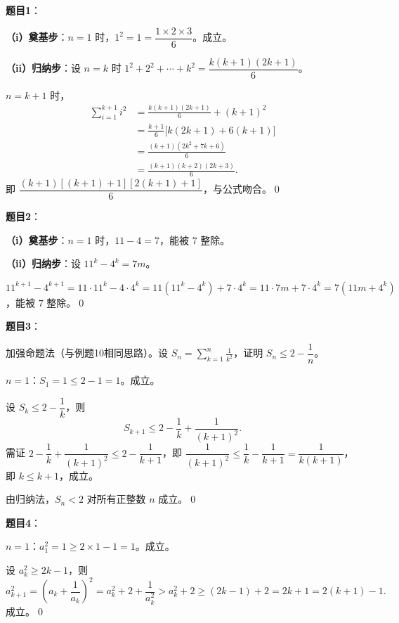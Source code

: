 \documentclass[12pt, a4paper]{ctexart}
\begin{document}
\begin{knowledgebox}[参考答案]

\textbf{题目1}：

\textbf{（i）奠基步}：$n=1$ 时，$1^2 = 1 = \dfrac{1 \times 2 \times 3}{6}$。成立。

\textbf{（ii）归纳步}：设 $n = k$ 时 $1^2 + 2^2 + \cdots + k^2 = \dfrac{k(k+1)(2k+1)}{6}$。

$n = k+1$ 时，
\begin{align*}
\sum_{i=1}^{k+1} i^2 &= \frac{k(k+1)(2k+1)}{6} + (k+1)^2 \\
&= \frac{k+1}{6}\Big[k(2k+1) + 6(k+1)\Big] \\
&= \frac{(k+1)(2k^2 + 7k + 6)}{6} \\
&= \frac{(k+1)(k+2)(2k+3)}{6}.
\end{align*}
即 $\dfrac{(k+1)[(k+1)+1][2(k+1)+1]}{6}$，与公式吻合。\qed

\bigskip

\textbf{题目2}：

\textbf{（i）奠基步}：$n=1$ 时，$11 - 4 = 7$，能被 $7$ 整除。

\textbf{（ii）归纳步}：设 $11^k - 4^k = 7m$。

$11^{k+1} - 4^{k+1} = 11 \cdot 11^k - 4 \cdot 4^k = 11(11^k - 4^k) + 7 \cdot 4^k = 11 \cdot 7m + 7 \cdot 4^k = 7(11m + 4^k)$，能被 $7$ 整除。\qed

\bigskip

\textbf{题目3}：

加强命题法（与例题10相同思路）。设 $S_n = \displaystyle\sum_{k=1}^{n}\frac{1}{k^2}$，证明 $S_n \leq 2 - \dfrac{1}{n}$。

$n=1$：$S_1 = 1 \leq 2 - 1 = 1$。成立。

设 $S_k \leq 2 - \dfrac{1}{k}$，则
\[ S_{k+1} \leq 2 - \frac{1}{k} + \frac{1}{(k+1)^2}. \]
需证 $2 - \dfrac{1}{k} + \dfrac{1}{(k+1)^2} \leq 2 - \dfrac{1}{k+1}$，即 $\dfrac{1}{(k+1)^2} \leq \dfrac{1}{k} - \dfrac{1}{k+1} = \dfrac{1}{k(k+1)}$，即 $k \leq k+1$，成立。

由归纳法，$S_n < 2$ 对所有正整数 $n$ 成立。\qed

\bigskip

\textbf{题目4}：

$n=1$：$a_1^2 = 1 \geq 2 \times 1 - 1 = 1$。成立。

设 $a_k^2 \geq 2k - 1$，则
\[ a_{k+1}^2 = \left(a_k + \frac{1}{a_k}\right)^2 = a_k^2 + 2 + \frac{1}{a_k^2} > a_k^2 + 2 \geq (2k-1) + 2 = 2k + 1 = 2(k+1) - 1. \]
成立。\qed

\bigskip


\end{knowledgebox}
\end{document}
